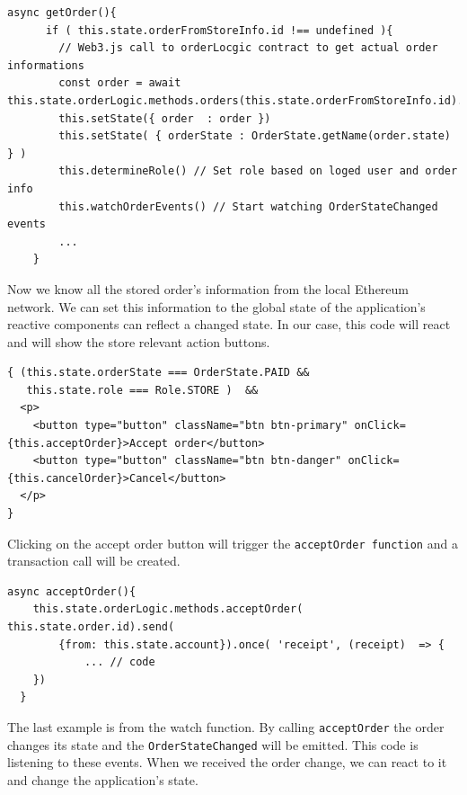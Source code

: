 \documentclass[thesis=M,english]{FITthesis}[2019/12/23]
\begin{document}
\begin{minipage}{\linewidth}
\begin{lstlisting}[caption=OrderLogicContract.sol getOrder function]
    async getOrder(){
      if ( this.state.orderFromStoreInfo.id !== undefined ){
        // Web3.js call to orderLocgic contract to get actual order informations
        const order = await this.state.orderLogic.methods.orders(this.state.orderFromStoreInfo.id).call()
        this.setState({ order  : order })
        this.setState( { orderState : OrderState.getName(order.state) } )
        this.determineRole() // Set role based on loged user and order info
        this.watchOrderEvents() // Start watching OrderStateChanged events
        ...
    }

\end{lstlisting}
\end{minipage}

Now we know all the stored order's information from the local Ethereum network. We can set this information to the global state of the application's reactive components can reflect a changed state. In our case, this code will react and will show the store relevant action buttons. 

\begin{lstlisting}[caption= App.js react JSX aviable actions ]
{ (this.state.orderState === OrderState.PAID &&
   this.state.role === Role.STORE )  &&
  <p>
    <button type="button" className="btn btn-primary" onClick={this.acceptOrder}>Accept order</button>
    <button type="button" className="btn btn-danger" onClick={this.cancelOrder}>Cancel</button>
  </p>
}

\end{lstlisting}

Clicking on the accept order button will trigger the \texttt{acceptOrder function} and a transaction call will be created. 

\begin{lstlisting}[caption=App.js calling acceptOrder function on smart contract]
 async acceptOrder(){
    this.state.orderLogic.methods.acceptOrder( this.state.order.id).send(
        {from: this.state.account}).once( 'receipt', (receipt)  => {
            ... // code
    })
  }
\end{lstlisting}

The last example is from the watch function. By calling \texttt{acceptOrder} the order changes its state and the \texttt{OrderStateChanged} will be emitted. This code is listening to these events. When we received the order change, we can react to it and change the application's state. 
\end{document}
